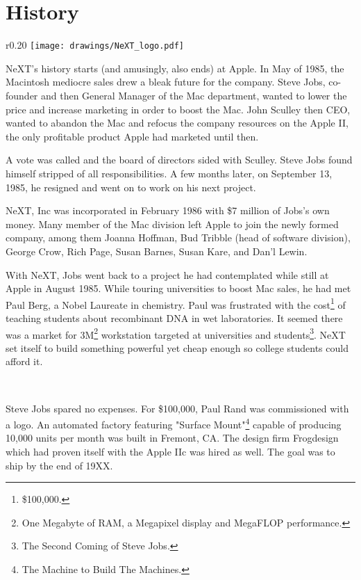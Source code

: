 \section{History}

\begin{wrapfigure}[8]{r}{0.20\textwidth}
\centering
\texttt{[image: drawings/NeXT\_logo.pdf]}
\end{wrapfigure}
\par
NeXT's history starts (and amusingly, also ends) at Apple. In May of 1985, the Macintosh mediocre sales drew a bleak future for the company. Steve Jobs, co-founder and then General Manager of the Mac department, wanted to lower the price and increase marketing in order to boost the Mac. John Sculley then CEO, wanted to abandon the Mac and refocus the company resources on the Apple II, the only profitable product Apple had marketed until then.\\
\par
 A vote was called and the board of directors sided with Sculley. Steve Jobs found himself stripped of all responsibilities. A few months later, on September 13, 1985, he resigned and went on to work on his next project.\\
\par
NeXT, Inc was incorporated in February 1986 with \$7 million of Jobs's own money. Many member of the Mac division left Apple to join the newly formed company, among them  Joanna Hoffman, Bud Tribble (head of software division), George Crow, Rich Page, Susan Barnes, Susan Kare, and Dan'l  Lewin.\\ 
\par
With NeXT, Jobs went back to a project he had contemplated while still at Apple in August 1985. While touring universities to boost Mac sales, he had met Paul Berg, a Nobel Laureate in chemistry. Paul was frustrated with the cost\footnote{\$100,000.} of teaching students about recombinant DNA in wet laboratories. It seemed there was a market for 3M\footnote{One Megabyte of RAM, a Megapixel display and MegaFLOP performance.} workstation targeted at universities and students\footnote{The Second Coming of Steve Jobs.}. NeXT set itself to build something powerful yet cheap enough so college students could afford it.\\
\par
{}\\
\par
Steve Jobs spared no expenses. For \$100,000, Paul Rand was commissioned with a logo. An automated factory featuring "Surface Mount"\footnote{The Machine to Build The Machines.} capable of producing 10,000 units per month was built in Fremont, CA. The design firm Frogdesign which had proven itself with the Apple IIc was hired as well. The goal was to ship by the end of 19XX.\\
